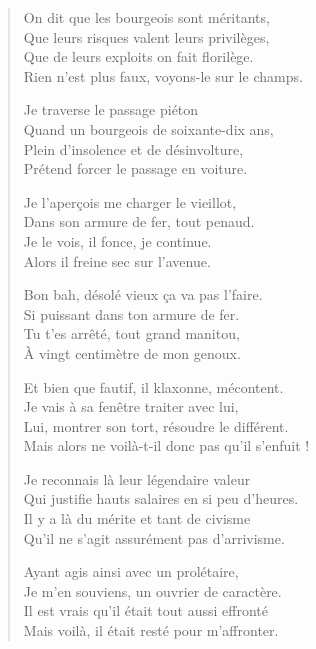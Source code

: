 \begin{verse}\quatrain
  On dit que les bourgeois sont méritants,\\ 
  Que leurs risques valent leurs privilèges,\\ 
  Que de leurs exploits on fait florilège.\\ 
  Rien n’est plus faux, voyons-le sur le champs.  %

  Je traverse le passage piéton\\ 
  Quand un bourgeois de soixante-dix ans,\\ 
  Plein d’insolence et de désinvolture,\\ 
  Prétend forcer le passage en voiture.  %

  Je l’aperçois me charger le vieillot,\\ 
  Dans son armure de fer, tout penaud.\\ 
  Je le vois, il fonce, je continue.\\ 
  Alors il freine sec sur l’avenue.

  Bon bah, désolé vieux ça va pas l’faire.\\ 
  Si puissant dans ton armure de fer.\\ 
  Tu t’es arrêté, tout grand manitou,\\ 
  À vingt centimètre de mon genoux.  %

  Et bien que fautif, il klaxonne, mécontent.\\ 
  Je vais à sa fenêtre traiter avec lui,\\ 
  Lui, montrer son tort, résoudre le différent.\\ 
  Mais alors ne voilà-t-il donc pas qu’il s’enfuit !  %

  Je reconnais là leur légendaire valeur\\ 
  Qui justifie hauts salaires en si peu d’heures.\\ 
  Il y a là du mérite et tant de civisme\\ 
  Qu’il ne s’agit assurément pas d’arrivisme.  %

  Ayant agis ainsi avec un prolétaire,\\ 
  Je m’en souviens, un ouvrier de caractère.\\ 
  Il est vrais qu’il était tout aussi effronté\\ 
  Mais voilà, il était resté pour m’affronter.  %
\end{verse}

